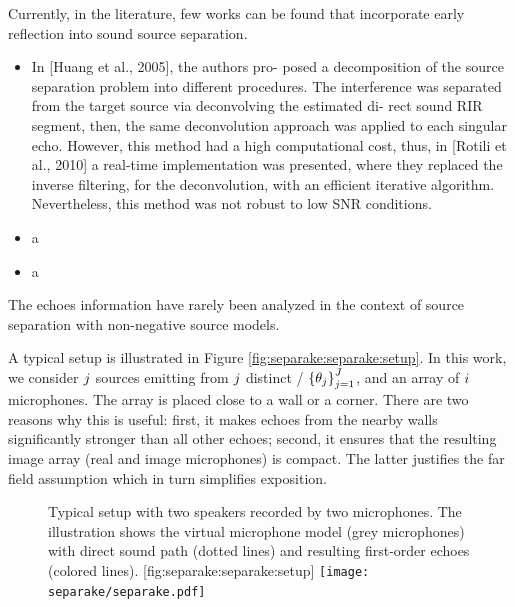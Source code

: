 \mynewline
Currently, in the literature, few works can be found that incorporate early reflection into sound source separation.
\begin{itemize}
    \item In [Huang et al., 2005], the authors pro- posed a decomposition of the source separation problem into different procedures. The interference was separated from the target source via deconvolving the estimated di- rect sound RIR segment, then, the same deconvolution approach was applied to each singular echo. However, this method had a high computational cost, thus, in [Rotili et al., 2010] a real-time implementation was presented, where they replaced the inverse filtering, for the deconvolution, with an efficient iterative algorithm. Nevertheless, this method was not robust to low SNR conditions.
    \item a
    \item a
\end{itemize}
The echoes information have rarely been analyzed in the context of source separation with non-negative source models.

\mynewline
A typical setup is illustrated in Figure \ref{fig:separake:separake:setup}.
In this work, we consider $j$ sources emitting from $j$ distinct \DOAdef/ $\set{\theta_\idxSrc}_{\idxSrc=1}^{\numSrcs}$, and an array of $i$ microphones.
The array is placed close to a wall or a corner.
There are two reasons why this is useful:
first, it makes echoes from the nearby walls significantly stronger than all other echoes;
second, it ensures that the resulting image array (real and image microphones) is compact.
The latter justifies the far field assumption which in turn simplifies exposition.

\begin{figure}[h]
    \begin{sidecaption}{%
        Typical setup with two speakers recorded by two microphones.
        The illustration shows the virtual microphone model (grey microphones) with direct sound path (dotted lines) and resulting first-order echoes (colored lines).
        }[fig:separake:separake:setup]
    \centering
    \texttt{[image: separake/separake.pdf]}
    \end{sidecaption}
\end{figure}

